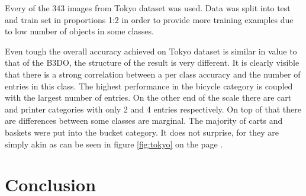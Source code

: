 	Every of the 343 images from Tokyo dataset was used. Data was split into test and train set in proportions 1:2 in order to provide more training examples due to low number of objects in some classes.
	
	Even tough the overall accuracy achieved on Tokyo dataset is similar in value to that of the B3DO, the structure of the result is very different. It is clearly visible that there is a strong correlation between a per class accuracy and the number of entries in this class. The highest performance in the bicycle category is coupled with the largest number of entries. On the other end of the scale there are cart and printer categories with only 2 and 4 entries respectively. On top of that there are differences between some classes are marginal. The majority of carts and baskets were put into the bucket category. It does not surprise, for they are simply akin as can be seen in figure \ref{fig:tokyo} on the page \pageref{fig:tokyo}.
	
\section{Conclusion}
	